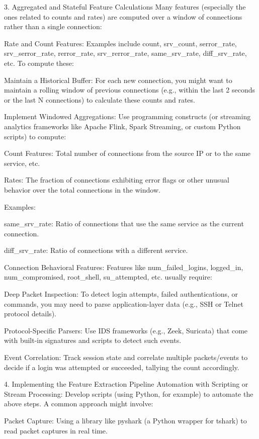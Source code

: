 \documentclass{article}
\begin{document}
3. Aggregated and Stateful Feature Calculations
Many features (especially the ones related to counts and rates) are computed over a window of connections rather than a single connection:

Rate and Count Features:
Examples include count, srv_count, serror_rate, srv_serror_rate, rerror_rate, srv_rerror_rate, same_srv_rate, diff_srv_rate, etc. To compute these:

Maintain a Historical Buffer:
For each new connection, you might want to maintain a rolling window of previous connections (e.g., within the last 2 seconds or the last N connections) to calculate these counts and rates.

Implement Windowed Aggregations:
Use programming constructs (or streaming analytics frameworks like Apache Flink, Spark Streaming, or custom Python scripts) to compute:

Count Features: Total number of connections from the source IP or to the same service, etc.

Rates: The fraction of connections exhibiting error flags or other unusual behavior over the total connections in the window.

Examples:

same_srv_rate: Ratio of connections that use the same service as the current connection.

diff_srv_rate: Ratio of connections with a different service.

Connection Behavioral Features:
Features like num_failed_logins, logged_in, num_compromised, root_shell, su_attempted, etc. usually require:

Deep Packet Inspection:
To detect login attempts, failed authentications, or commands, you may need to parse application-layer data (e.g., SSH or Telnet protocol details).

Protocol-Specific Parsers:
Use IDS frameworks (e.g., Zeek, Suricata) that come with built-in signatures and scripts to detect such events.

Event Correlation:
Track session state and correlate multiple packets/events to decide if a login was attempted or succeeded, tallying the count accordingly.

4. Implementing the Feature Extraction Pipeline
Automation with Scripting or Stream Processing:
Develop scripts (using Python, for example) to automate the above steps. A common approach might involve:

Packet Capture: Using a library like pyshark (a Python wrapper for tshark) to read packet captures in real time.
\end{document}
